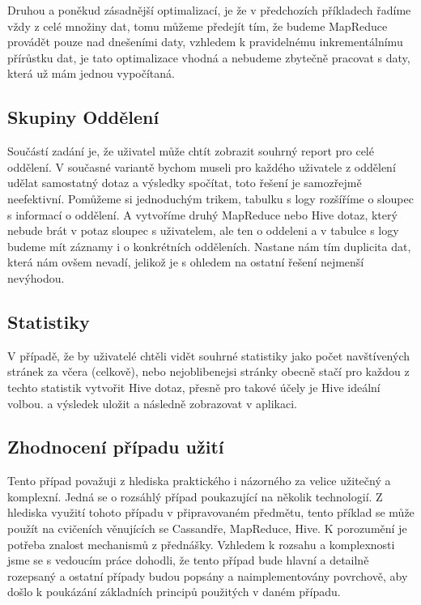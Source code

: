 \documentclass[thesis=M,czech]{FITthesis}[2012/06/26]
\begin{document}
Druhou a poněkud zásadnější optimalizací, je že v předchozích příkladech řadíme vždy z celé množiny dat, tomu můžeme předejít tím, že budeme MapReduce provádět pouze nad dnešeními daty, vzhledem k pravidelnému inkrementálnímu přírůstku dat, je tato optimalizace vhodná a nebudeme zbytečně pracovat s daty, která už mám jednou vypočítaná. 

\subsection{Skupiny Oddělení}
Součástí zadání je, že uživatel může chtít zobrazit souhrný report pro celé oddělení. V současné variantě bychom museli pro každého uživatele z oddělení udělat samostatný dotaz a výsledky spočítat, toto řešení je samozřejmě neefektivní. Pomůžeme si jednoduchým trikem, tabulku s logy rozšíříme o sloupec s informací o oddělení. A vytvoříme druhý MapReduce nebo Hive dotaz, který nebude brát v potaz sloupec s uživatelem, ale ten o oddeleni a v tabulce s logy budeme mít záznamy i o konkrétních odděleních. Nastane nám tím duplicita dat, která nám ovšem nevadí, jelikož je s ohledem na ostatní řešení nejmenší nevýhodou. 

\subsection{Statistiky}
V případě, že by uživatelé chtěli vidět souhrné statistiky jako počet navštívených stránek za včera (celkově), nebo nejoblibenejsi stránky obecně stačí pro každou z techto statistik vytvořit Hive dotaz, přesně pro takové účely je Hive ideální volbou. a výsledek uložit a následně zobrazovat v aplikaci. 

\subsection{Zhodnocení případu užití}
Tento případ považuji z hlediska praktického i názorného za velice užitečný a komplexní. Jedná se o rozsáhlý případ poukazující na několik technologií. Z hlediska využití tohoto případu v připravovaném předmětu, tento příklad se může použít na cvičeních věnujících se Cassandře, MapReduce, Hive. K porozumění je potřeba znalost mechanismů z přednášky. Vzhledem k rozsahu a komplexnosti jsme se s vedoucím práce dohodli, že tento případ bude hlavní a detailně rozepsaný a ostatní případy budou popsány a naimplementovány povrchově, aby došlo k poukázání základních principů použitých v daném případu. 
\end{document}
